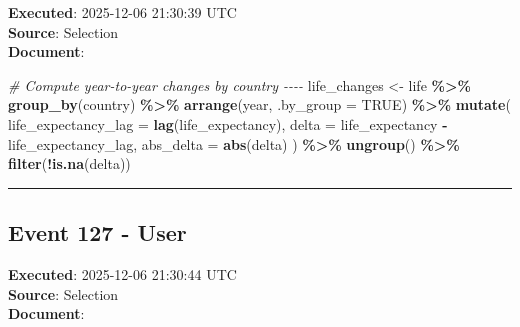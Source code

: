 \documentclass[
  11pt,
]{article}
\newenvironment{Shaded}{\begin{snugshade}}{\end{snugshade}}
\newcommand{\AttributeTok}[1]{\textcolor[rgb]{0.13,0.29,0.53}{#1}}
\newcommand{\CommentTok}[1]{\textcolor[rgb]{0.56,0.35,0.01}{\textit{#1}}}
\newcommand{\ConstantTok}[1]{\textcolor[rgb]{0.56,0.35,0.01}{#1}}
\newcommand{\FunctionTok}[1]{\textcolor[rgb]{0.13,0.29,0.53}{\textbf{#1}}}
\newcommand{\NormalTok}[1]{#1}
\newcommand{\OtherTok}[1]{\textcolor[rgb]{0.56,0.35,0.01}{#1}}
\newcommand{\SpecialCharTok}[1]{\textcolor[rgb]{0.81,0.36,0.00}{\textbf{#1}}}
\begin{document}
\textbf{Executed}: 2025-12-06 21:30:39 UTC\\
\textbf{Source}: Selection\\
\textbf{Document}:

\begin{Shaded}
\begin{Highlighting}[]
\CommentTok{\# Compute year{-}to{-}year changes by country {-}{-}{-}{-}}
\NormalTok{life\_changes }\OtherTok{\textless{}{-}}\NormalTok{ life }\SpecialCharTok{\%\textgreater{}\%}
  \FunctionTok{group\_by}\NormalTok{(country) }\SpecialCharTok{\%\textgreater{}\%}
  \FunctionTok{arrange}\NormalTok{(year, }\AttributeTok{.by\_group =} \ConstantTok{TRUE}\NormalTok{) }\SpecialCharTok{\%\textgreater{}\%}
  \FunctionTok{mutate}\NormalTok{(}
    \AttributeTok{life\_expectancy\_lag =} \FunctionTok{lag}\NormalTok{(life\_expectancy),}
    \AttributeTok{delta =}\NormalTok{ life\_expectancy }\SpecialCharTok{{-}}\NormalTok{ life\_expectancy\_lag,}
    \AttributeTok{abs\_delta =} \FunctionTok{abs}\NormalTok{(delta)}
\NormalTok{  ) }\SpecialCharTok{\%\textgreater{}\%}
  \FunctionTok{ungroup}\NormalTok{() }\SpecialCharTok{\%\textgreater{}\%}
  \FunctionTok{filter}\NormalTok{(}\SpecialCharTok{!}\FunctionTok{is.na}\NormalTok{(delta))}
\end{Highlighting}
\end{Shaded}

\begin{center}\rule{0.5\linewidth}{0.5pt}\end{center}

\subsection{Event 127 - User}\label{event-127---user}

\textbf{Executed}: 2025-12-06 21:30:44 UTC\\
\textbf{Source}: Selection\\
\textbf{Document}:
\end{document}
